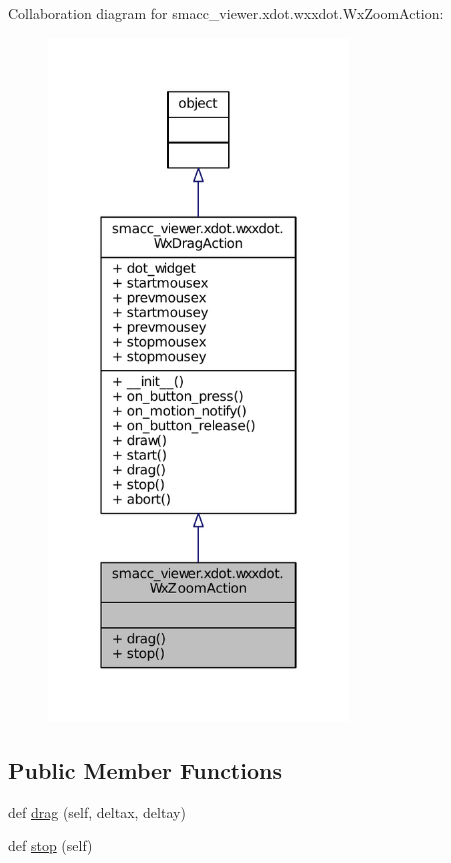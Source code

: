 Collaboration diagram for smacc\+\_\+viewer.\+xdot.\+wxxdot.\+Wx\+Zoom\+Action\+:
\nopagebreak
\begin{figure}[H]
\begin{center}
\leavevmode
\includegraphics[width=226pt]{classsmacc__viewer_1_1xdot_1_1wxxdot_1_1WxZoomAction__coll__graph}
\end{center}
\end{figure}
\subsection*{Public Member Functions}
\begin{DoxyCompactItemize}
\item 
def \hyperlink{classsmacc__viewer_1_1xdot_1_1wxxdot_1_1WxZoomAction_adf30a71b5a15b54066c8a58161d02320}{drag} (self, deltax, deltay)
\item 
def \hyperlink{classsmacc__viewer_1_1xdot_1_1wxxdot_1_1WxZoomAction_a596dc21f5accb8a8c065b97855501026}{stop} (self)
\end{DoxyCompactItemize}
